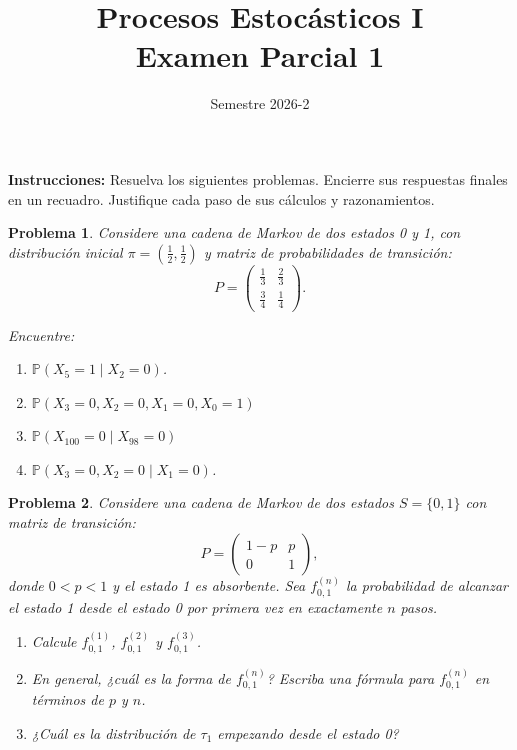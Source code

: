 \documentclass[12pt]{article}
\title{Procesos Estocásticos I \\ Examen Parcial 1}
\author{Semestre 2026-2}
\date{}
\newtheorem{problem}{Problema}
\begin{document}
\maketitle

\textbf{Instrucciones:} Resuelva los siguientes problemas. Encierre sus respuestas finales en un recuadro. Justifique cada paso de sus cálculos y razonamientos.


\begin{problem}
Considere una cadena de Markov de dos estados 0 y 1, con distribución inicial $\pi = \left(\frac{1}{2}, \frac{1}{2}\right)$ y matriz de probabilidades de transición:
\[
P = \begin{pmatrix}
\frac{1}{3} & \frac{2}{3} \\
\frac{3}{4} & \frac{1}{4}
\end{pmatrix}.
\]

Encuentre:

\begin{enumerate}
 
    \item[(a)] $\mathbb{P}(X_5 = 1 \mid X_2 = 0)$.
    
    \item[(b)] $\mathbb{P}(X_3 = 0, X_2 = 0, X_1 = 0, X_0 = 1)$ 

    \item[(c)] $\mathbb{P}(X_{100} = 0 \mid X_{98} = 0)$
    
    \item[(d)] $\mathbb{P}(X_3 = 0, X_2 = 0 \mid X_1 = 0)$.
\end{enumerate}
\end{problem}

\begin{problem}
Considere una cadena de Markov de dos estados $S = \{0, 1\}$ con matriz de transición:
\[
P = \begin{pmatrix}
1-p & p \\
0 & 1
\end{pmatrix},
\]
donde $0 < p < 1$ y el estado 1 es absorbente. Sea $f_{0,1}^{(n)}$ la probabilidad de alcanzar el estado 1 desde el estado 0 por primera vez en exactamente $n$ pasos.

\begin{enumerate}
    \item[(a)] Calcule $f_{0,1}^{(1)}$, $f_{0,1}^{(2)}$ y $f_{0,1}^{(3)}$. 
    
    \item[(b)] En general, ¿cuál es la forma de $f_{0,1}^{(n)}$? Escriba una fórmula para $f_{0,1}^{(n)}$ en términos de $p$ y $n$.
    
    \item[(c)] ¿Cuál es la distribución de $\tau_1$ empezando desde el estado 0? 
\end{enumerate}
\end{problem}
\end{document}
